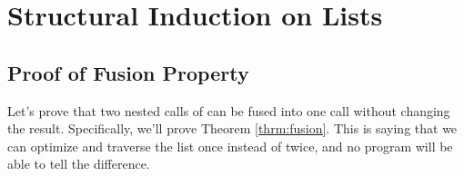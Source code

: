 \documentclass[11pt]{article}
\begin{document}
\section{Structural Induction on Lists}

\newcommand{\rb}{rB}
\newcommand{\LHS}[1]{\mappm{\rb}{(\mappm{\rb}{({#1},a)},b)}}
\newcommand{\RHS}[1]{\mappm{\rb}{({#1},a+b)}}
\newcommand{\pred}[1]{\ce{\LHS{#1}}{\RHS{#1}}}
\newcommand{\rbbod}[2]{\mcase{#1}{\vnil}{\vnil}
  {\msml{x::xs}}{\msml{(x+{#2})}\msml{::}\mappm{\rb}{(xs,{#2})}}}

\subsection{Proof of Fusion Property}
Let's prove that two nested calls of  can be fused into one
call without changing the result.  Specifically, we'll prove Theorem
\ref{thrm:fusion}. This is saying that we can optimize and traverse the
list once instead of twice, and no program will be able to tell the
difference.
\end{document}
